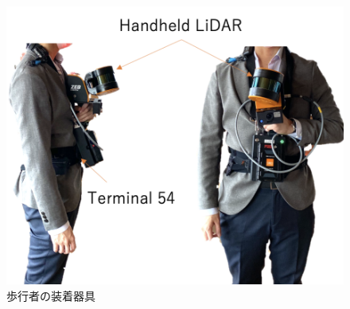 \begin{figure}[ht]
	\centering
	\includegraphics[width=\linewidth]{image/lidar.jpg}
	\caption{歩行者の装着器具}    \label{fig:step_detect}
\end{figure}
